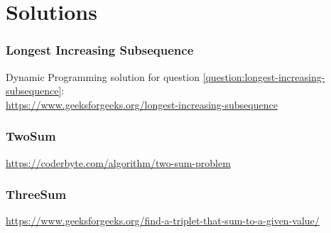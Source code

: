 \chapter{Solutions} \label{chap:solutions}


\subsection{Longest Increasing Subsequence} \label{solution:longest-increasing-subsequence}
Dynamic Programming solution for question \ref{question:longest-increasing-subsequence}: \\\mbox{\url{https://www.geeksforgeeks.org/longest-increasing-subsequence}}

\subsection{TwoSum} \label{solution:two-sum}
\mbox{\url{https://coderbyte.com/algorithm/two-sum-problem}}

\subsection{ThreeSum} \label{solution:three-sum}
\mbox{\url{https://www.geeksforgeeks.org/find-a-triplet-that-sum-to-a-given-value/}}